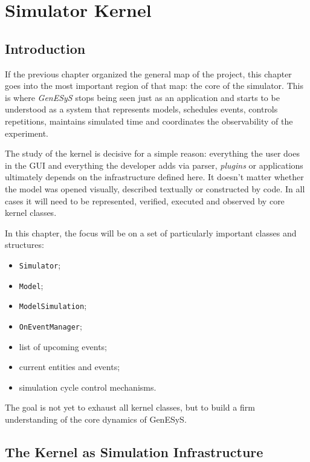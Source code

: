 \chapter{Simulator Kernel}
\label{chap:nucleo_do_simulador}

\section{Introduction}
\label{sec:cap7_introducao}

If the previous chapter organized the general map of the project, this chapter goes into the most important region of that map: the core of the simulator. This is where \textit{GenESyS} stops being seen just as an application and starts to be understood as a system that represents models, schedules events, controls repetitions, maintains simulated time and coordinates the observability of the experiment.

The study of the kernel is decisive for a simple reason: everything the user does in the GUI and everything the developer adds via parser, \textit{plugins} or applications ultimately depends on the infrastructure defined here. It doesn't matter whether the model was opened visually, described textually or constructed by code. In all cases it will need to be represented, verified, executed and observed by core kernel classes.

In this chapter, the focus will be on a set of particularly important classes and structures:
\begin{itemize}
 \item \texttt{Simulator};
 \item \texttt{Model};
 \item \texttt{ModelSimulation};
 \item \texttt{OnEventManager};
 \item list of upcoming events;
 \item current entities and events;
 \item simulation cycle control mechanisms.
\end{itemize}

The goal is not yet to exhaust all kernel classes, but to build a firm understanding of the core dynamics of GenESyS.

\section{The Kernel as Simulation Infrastructure}
\label{sec:cap7_kernel_como_infraestrutura}

